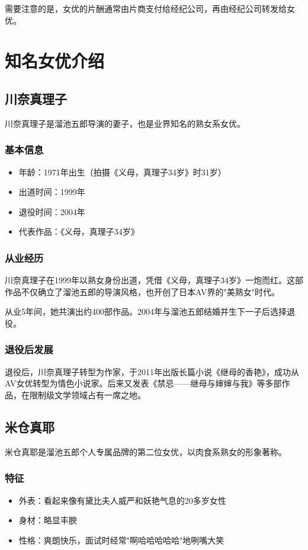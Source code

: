 \documentclass[12pt,UTF8]{ctexbook}
\begin{document}
需要注意的是，女优的片酬通常由片商支付给经纪公司，再由经纪公司转发给女优。

\chapter{知名女优介绍}

\section{川奈真理子}

川奈真理子是溜池五郎导演的妻子，也是业界知名的熟女系女优。

\subsection{基本信息}
\begin{itemize}
\item 年龄：1971年出生（拍摄《义母，真理子34岁》时31岁）
\item 出道时间：1999年
\item 退役时间：2004年
\item 代表作品：《义母，真理子34岁》
\end{itemize}

\subsection{从业经历}

川奈真理子在1999年以熟女身份出道，凭借《义母，真理子34岁》一炮而红。这部作品不仅确立了溜池五郎的导演风格，也开创了日本AV界的"美熟女"时代。

从业5年间，她共演出约400部作品。2004年与溜池五郎结婚并生下一子后选择退役。

\subsection{退役后发展}

退役后，川奈真理子转型为作家，于2011年出版长篇小说《继母的香艳》，成功从AV女优转型为情色小说家。后来又发表《禁忌——继母与婶婶与我》等多部作品，在限制级文学领域占有一席之地。

\section{米仓真耶}

米仓真耶是溜池五郎个人专属品牌的第二位女优，以肉食系熟女的形象著称。

\subsection{特征}
\begin{itemize}
\item 外表：看起来像有黛比夫人威严和妖艳气息的20多岁女性
\item 身材：略显丰腴
\item 性格：爽朗快乐，面试时经常"啊哈哈哈哈哈"地咧嘴大笑
\end{itemize}
\end{document}
